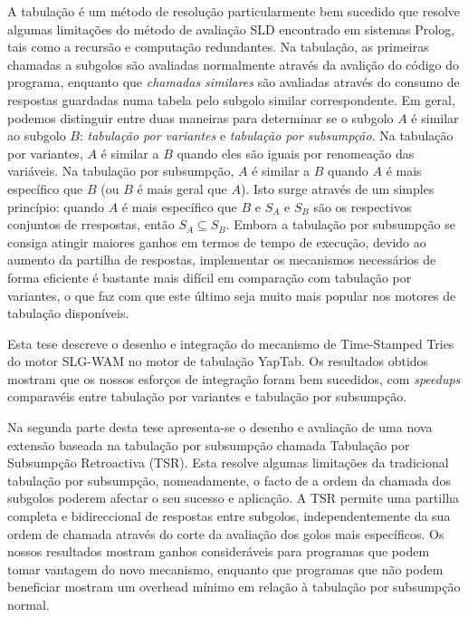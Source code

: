 A tabulação é um método de resolução particularmente bem sucedido que resolve algumas limitações
do método de avaliação SLD encontrado em sistemas Prolog, tais como a recursão e computação redundantes.
Na tabulação, as primeiras chamadas a subgolos são avaliadas normalmente através da avalição do código do
programa, enquanto que \emph{chamadas similares} são avaliadas através do consumo de respostas guardadas
numa tabela pelo subgolo similar correspondente.
Em geral, podemos distinguir entre duas maneiras para determinar se o subgolo $A$ é similar ao subgolo $B$:
\emph{tabulação por variantes} e \emph{tabulação por subsumpção}.
Na tabulação por variantes, $A$ é similar a $B$ quando eles são iguais por renomeação das variáveis.
Na tabulação por subsumpção, $A$ é similar a $B$ quando $A$ é mais específico que $B$ (ou $B$ é mais geral que $A$).
Isto surge através de um simples princípio: quando $A$ é mais específico que $B$ e $S_A$ e $S_B$ são os respectivos
conjuntos de rrespostas, então $S_A \subseteq S_B$.
Embora a tabulação por subsumpção se consiga atingir maiores ganhos em termos de tempo de execução, devido
ao aumento da partilha de respostas, implementar os mecanismos necessários de forma eficiente é bastante
mais difícil em comparação com tabulação por variantes, o que faz com que este último seja muito mais popular
nos motores de tabulação disponíveis.

Esta tese descreve o desenho e integração do mecanismo de Time-Stamped Tries do motor SLG-WAM no motor de tabulação
YapTab. Os resultados obtidos mostram que os nossos esforços de integração foram bem sucedidos, com \emph{speedups}
comparavéis entre tabulação por variantes e tabulação por subsumpção.

Na segunda parte desta tese apresenta-se o desenho e avaliação de uma nova extensão baseada na tabulação
por subsumpção chamada Tabulação por Subsumpção Retroactiva (TSR). Esta resolve algumas limitações da tradicional
tabulação por subsumpção, nomeadamente, o facto de a ordem da chamada dos subgolos poderem afectar o seu sucesso e
aplicação. A TSR permite uma partilha completa e bidireccional de respostas entre subgolos, independentemente da
sua ordem de chamada através do corte da avaliação dos golos mais específicos.
Os nossos resultados mostram ganhos consideráveis para programas que podem tomar vantagem do novo mecanismo,
enquanto que programas que não podem beneficiar mostram um overhead mínimo em relação à tabulação por subsumpção
normal.